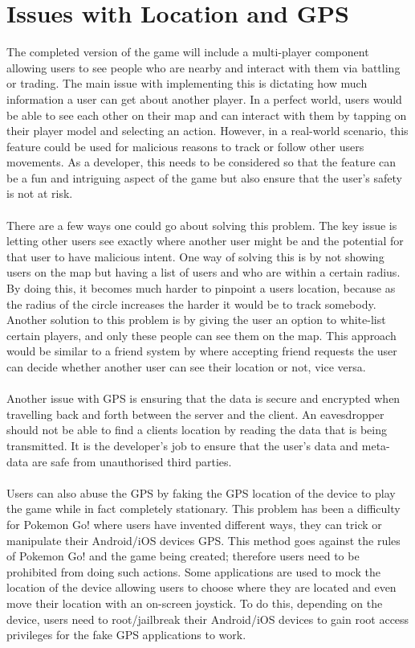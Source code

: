 \documentclass[a4paper]{report}
\begin{document}
\section{Issues with Location and GPS}
The completed version of the game will include a multi-player component allowing users to see people who are nearby and interact with them via battling or trading. The main issue with implementing this is dictating how much information a user can get about another player. In a perfect world, users would be able to see each other on their map and can interact with them by tapping on their player model and selecting an action. However, in a real-world scenario, this feature could be used for malicious reasons to track or follow other users movements. As a developer, this needs to be considered so that the feature can be a fun and intriguing aspect of the game but also ensure that the user's safety is not at risk. 
\\\\
There are a few ways one could go about solving this problem. The key issue is letting other users see exactly where another user might be and the potential for that user to have malicious intent. One way of solving this is by not showing users on the map but having a list of users and who are within a certain radius. By doing this, it becomes much harder to pinpoint a users location, because as the radius of the circle increases the harder it would be to track somebody. Another solution to this problem is by giving the user an option to white-list certain players, and only these people can see them on the map. This approach would be similar to a friend system by where accepting friend requests the user can decide whether another user can see their location or not, vice versa. 
\\\\
Another issue with GPS is ensuring that the data is secure and encrypted when travelling back and forth between the server and the client. An eavesdropper should not be able to find a clients location by reading the data that is being transmitted. It is the developer's job to ensure that the user's data and meta-data are safe from unauthorised third parties. 
\\\\
Users can also abuse the GPS by faking the GPS location of the device to play the game while in fact completely stationary. This problem has been a difficulty for Pokemon Go! where users have invented different ways, they can trick or manipulate their Android/iOS devices GPS. This method goes against the rules of Pokemon Go! and the game being created; therefore users need to be prohibited from doing such actions. Some applications are used to mock the location of the device allowing users to choose where they are located and even move their location with an on-screen joystick. To do this, depending on the device, users need to root/jailbreak their Android/iOS devices to gain root access privileges for the fake GPS applications to work. 
\end{document}
